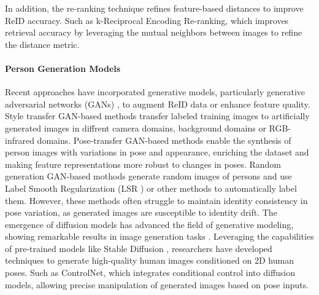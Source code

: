 In addition, the re-ranking technique refines feature-based distances to improve ReID accuracy. Such as k-Reciprocal Encoding Re-ranking\cite{zhong2017re}, which improves retrieval accuracy by leveraging the mutual neighbors between images to refine the distance metric. 

\paragraph{Person Generation Models}
Recent approaches have incorporated generative models, particularly generative adversarial networks (GANs) \cite{goodfellow2014generative}, to augment ReID data or enhance feature quality. Style transfer GAN-based methods\cite{zhong2018camstyle, dai2018cross, huang2019sbsgan, pang2022cross} transfer labeled training images to artificially generated images in diffrent camera domains, background domains or RGB-infrared domains. Pose-transfer GAN-based methods\cite{siarohin2018deformable,qian2018pose, liu2018pose, borgia2019gan, zhang2020pac} enable the synthesis of person images with variations in pose and appearance, enriching the dataset and making feature representations more robust to changes in poses. Random generation GAN-based mothods \cite{zheng2017unlabeled, ainam2019sparse, hussin2021stylegan} generate random images of persons and use Label Smooth Regularization (LSR \cite{szegedy2016rethinking}) or other methods to automatically label them. However, these methods often struggle to maintain identity consistency in pose variation, as generated images are susceptible to identity drift. 
The emergence of diffusion models has advanced the field of generative modeling, showing remarkable results in image generation tasks \cite{ho2020denoising}. Leveraging the capabilities of pre-trained models like Stable Diffusion \cite{rombach2022high}, researchers have developed techniques\cite{bhunia2023person, zhang2023adding} to generate high-quality human images conditioned on 2D human poses. Such as ControlNet\cite{zhang2023adding}, which integrates conditional control into diffusion models, allowing precise manipulation of generated images based on pose inputs.




